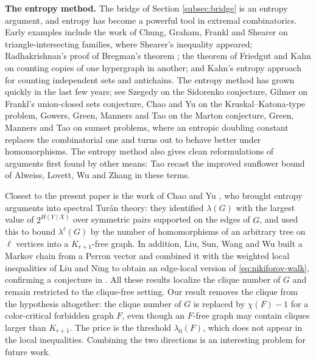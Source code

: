 \documentclass[11pt, a4paper]{article}
\theoremstyle{definition}
\theoremstyle{plain}
\begin{document}
\smallskip
\noindent
{\bf The entropy method.}
The bridge of Section \ref{subsec:bridge} is an entropy argument, and entropy \cite{Shannon1948} 
has become a powerful tool in extremal combinatorics. 
Early examples include the work of Chung, Graham, Frankl and Shearer \cite{CGFS1986}
on triangle-intersecting families, 
where Shearer's inequality appeared;   Radhakrishnan's proof of Bregman's theorem \cite{Rad1997};  
the theorem of Friedgut and Kahn \cite{FK1998}
on counting copies of one hypergraph in another;  and Kahn's entropy approach \cite{Kahn2002} for counting independent sets and antichains. 
The entropy method has grown quickly in the last few years;
see Szegedy \cite{Szegedy2014} on the Sidorenko conjecture, 
Gilmer \cite{Gil2022} on Frankl's union-closed sets conjecture, 
Chao and Yu  \cite{CY2024} on the Kruskal--Katona-type problem,  
Gowers, Green, Manners and Tao
\cite{GGMT2025} on the Marton conjecture, 
Green, Manners and Tao
\cite{GMT2025} on sumset problems, where an entropic doubling constant replaces the combinatorial one and turns
out to behave better under homomorphisms.  
The entropy method also gives clean reformulations of arguments first found by other means: Tao \cite{Tao2020} recast the improved sunflower bound of Alweiss, Lovett, Wu and Zhang \cite{ALWZ2021} in these terms. 

\smallskip 
Closest to the present paper is the work of Chao and Yu \cite{CY2026}, who brought entropy arguments into spectral Tur\'an theory: they identified $\lambda (G)$ with the largest value of $2^{H(Y\mid X)}$ over
symmetric pairs supported on the edges of $G$, and used this to bound $\lambda^{\ell}(G)$ by the number of homomorphisms of an arbitrary tree on $\ell$ vertices into a $K_{r+1}$-free graph. 
 In addition, Liu, Sun, Wang and Wu \cite{LSWW2026} built a
Markov chain from a Perron vector and combined it with the weighted local inequalities of Liu and Ning
\cite{LiuNing2026,LiuNing2025} to obtain an edge-local version  of \eqref{eq:nikiforov-walk}, confirming a conjecture in \cite{KKP2025}. 
All these results localize the clique number of $G$ and remain restricted to the clique-free setting. 
Our result removes the clique from the hypothesis altogether: the clique number of $G$ is replaced by $\chi (F)-1$ for a
color-critical forbidden graph $F$, even though an $F$-free graph may contain cliques larger than $K_{r+1}$.
The price is the threshold $\lambda_0(F)$, which does not appear in the local inequalities.  Combining the two directions is an interesting problem for future work. 
\end{document}
